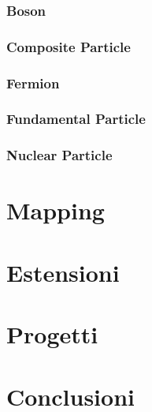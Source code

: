 \documentclass[12pt,a4paper,openright,twoside]{book}
\begin{document}
\subsection{Boson}
\subsection{Composite Particle}
\subsection{Fermion}
\subsection{Fundamental Particle}
\subsection{Nuclear Particle}

\chapter{Mapping} %
\label{chap:mapping}

\chapter{Estensioni} %
\label{chap:extensions}

\chapter{Progetti} %
\label{chap:projects}

\chapter{Conclusioni}
\label{chap:conclusions}





\end{document}
